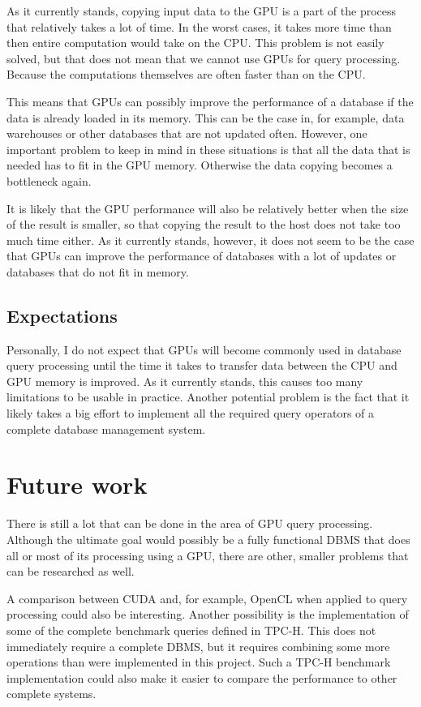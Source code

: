 \documentclass[a4paper,titlepage]{article}
\begin{document}
As it currently stands, copying input data to the GPU is a part of the process that relatively takes a lot of time. In the worst cases, it takes more time than then entire computation would take on the CPU. This problem is not easily solved, but that does not mean that we cannot use GPUs for query processing. Because the computations themselves are often faster than on the CPU. 

This means that GPUs can possibly improve the performance of a database if the data is already loaded in its memory. This can be the case in, for example, data warehouses or other databases that are not updated often. However, one important problem to keep in mind in these situations is that all the data that is needed has to fit in the GPU memory. Otherwise the data copying becomes a bottleneck again. 

It is likely that the GPU performance will also be relatively better when the size of the result is smaller, so that copying the result to the host does not take too much time either. As it currently stands, however, it does not seem to be the case that GPUs can improve the performance of databases with a lot of updates or databases that do not fit in memory.

\subsection{Expectations}
Personally, I do not expect that GPUs will become commonly used in database query processing until the time it takes to transfer data between the CPU and GPU memory is improved. As it currently stands, this causes too many limitations to be usable in practice. Another potential problem is the fact that it likely takes a big effort to implement all the required query operators of a complete database management system.

\section{Future work}
There is still a lot that can be done in the area of GPU query processing. Although the ultimate goal would possibly be a fully functional DBMS that does all or most of its processing using a GPU, there are other, smaller problems that can be researched as well.

A comparison between CUDA and, for example, OpenCL when applied to query processing could also be interesting. Another possibility is the implementation of some of the complete benchmark queries defined in TPC-H. This does not immediately require a complete DBMS, but it requires combining some more operations than were implemented in this project. Such a TPC-H benchmark implementation could also make it easier to compare the performance to other complete systems.
\end{document}
